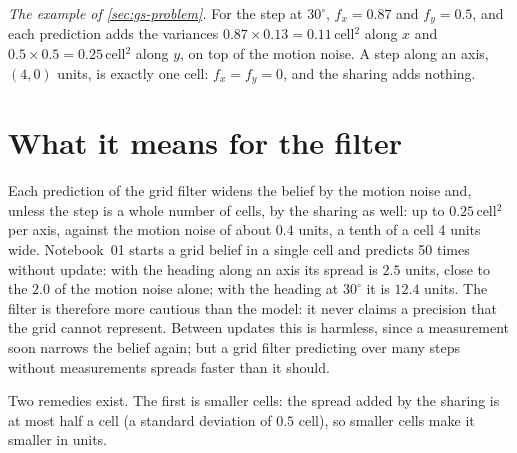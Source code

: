 \emph{The example of \cref{sec:gs-problem}.} For the step at $30^\circ$,
$f_x=0.87$ and $f_y=0.5$, and each prediction adds the variances
$0.87\times0.13=0.11$\,cell$^2$ along $x$ and $0.5\times0.5=0.25$\,cell$^2$
along $y$, on top of the motion noise. A step along an axis, $(4,0)$
units, is exactly one cell: $f_x=f_y=0$, and the sharing adds nothing.

\section{What it means for the filter}
\label{sec:gs-filter}

Each prediction of the grid filter widens the belief by the motion noise
and, unless the step is a whole number of cells, by the sharing as well:
up to $0.25$\,cell$^2$ per axis, against the motion noise of about $0.4$
units, a tenth of a cell 4 units wide. Notebook~01 starts a grid belief in
a single cell and predicts 50 times without update: with the heading along
an axis its spread is $2.5$ units, close to the $2.0$ of the motion noise
alone; with the heading at $30^\circ$ it is $12.4$ units. The filter is
therefore more cautious than the model: it never claims a precision that
the grid cannot represent. Between updates this is harmless, since a
measurement soon narrows the belief again; but a grid filter predicting
over many steps without measurements spreads faster than it should.

Two remedies exist. The first is smaller cells: the spread added by the
sharing is at most half a cell (a standard deviation of $0.5$ cell), so
smaller cells make it smaller in units.

